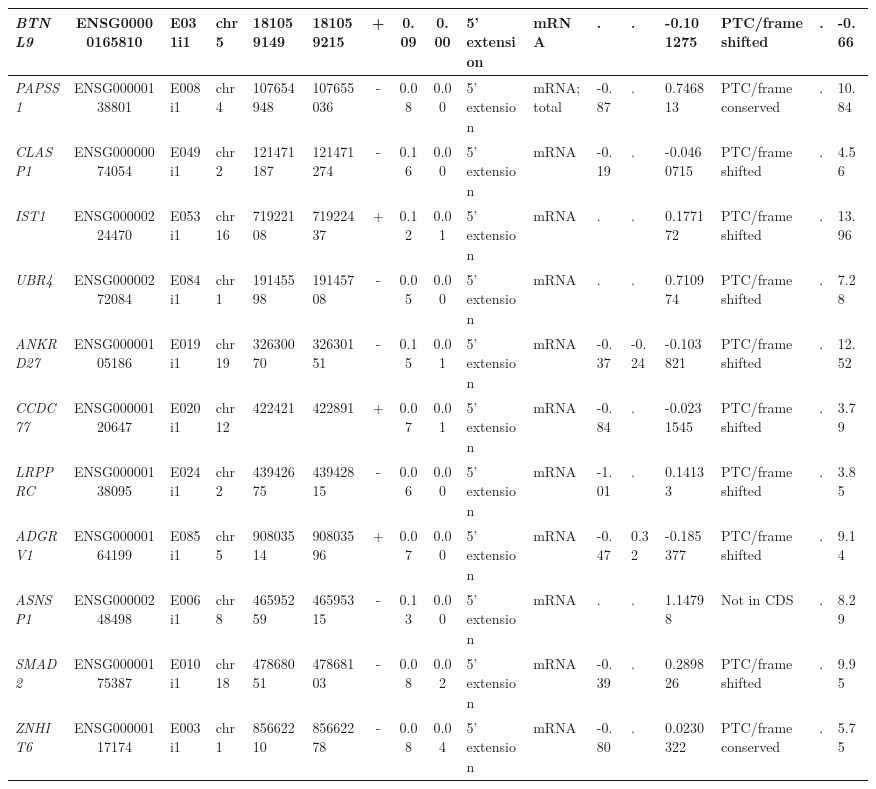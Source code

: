 \begin{appendices}
\begin{landscape}
\begin{table}
{\begin{tabular}{|l|c|l|l|l|l|c|c|c|l|l|l|l|l|l|l|l|}
		\textit{BTNL9} & ENSG00000165810 & E031i1 & chr5  & 181059149 & 181059215 & +     & 0.09  & 0.00  & 5' extension & mRNA  & . & . & -0.101275 & PTC/frame shifted & . &  -0.66 \\ \hline
		\textit{PAPSS1} & ENSG00000138801 & E008i1 & chr4  & 107654948 & 107655036 & -     & 0.08  & 0.00  & 5' extension & mRNA;total & -0.87 & . & 0.746813 & PTC/frame conserved & . &  10.84 \\ \hline
		\textit{CLASP1} & ENSG00000074054 & E049i1 & chr2  & 121471187 & 121471274 & -     & 0.16  & 0.00  & 5' extension & mRNA  & -0.19 & . & -0.0460715 & PTC/frame shifted & . &  4.56 \\ \hline
		\textit{IST1} & ENSG00000224470 & E053i1 & chr16 & 71922108 & 71922437 & +     & 0.12  & 0.01  & 5' extension & mRNA  & . & . & 0.177172 & PTC/frame shifted & . &  13.96 \\ \hline
		\textit{UBR4} & ENSG00000272084& E084i1 & chr1  & 19145598 & 19145708 & -     & 0.05  & 0.00  & 5' extension & mRNA  & . & . & 0.710974 & PTC/frame shifted & . &  7.28 \\ \hline
		\textit{ANKRD27} & ENSG00000105186 & E019i1 & chr19 & 32630070 & 32630151 & -     & 0.15  & 0.01  & 5' extension & mRNA  & -0.37 & -0.24 & -0.103821 & PTC/frame shifted & . &  12.52 \\ \hline
		\textit{CCDC77} & ENSG00000120647 & E020i1 & chr12 & 422421 & 422891 & +     & 0.07  & 0.01  & 5' extension & mRNA  & -0.84 & . & -0.0231545 & PTC/frame shifted & . &  3.79 \\ \hline
		\textit{LRPPRC} & ENSG00000138095 & E024i1 & chr2  & 43942675 & 43942815 & -     & 0.06  & 0.00  & 5' extension & mRNA  & -1.01 & . & 0.14133 & PTC/frame shifted & . &  3.85 \\ \hline
		\textit{ADGRV1} & ENSG00000164199 & E085i1 & chr5  & 90803514 & 90803596 & +     & 0.07  & 0.00  & 5' extension & mRNA  & -0.47 & 0.32  & -0.185377 & PTC/frame shifted & . &  9.14 \\ \hline
		\textit{ASNSP1} & ENSG00000248498 & E006i1 & chr8  & 46595259 & 46595315 & -     & 0.13  & 0.00  & 5' extension & mRNA  & . & . & 1.14798 & Not in CDS     & . &  8.29 \\ \hline
		\textit{SMAD2} & ENSG00000175387 & E010i1 & chr18 & 47868051 & 47868103 & -     & 0.08  & 0.02  & 5' extension & mRNA  & -0.39 & . & 0.289826 & PTC/frame shifted & . &  9.95 \\ \hline
		\textit{ZNHIT6} & ENSG00000117174 & E003i1 & chr1  & 85662210 & 85662278 & -     & 0.08  & 0.04  & 5' extension & mRNA  & -0.80 & . & 0.0230322 & PTC/frame conserved & . &  5.75 \\ \hline

\end{tabular}}
\end{table}
\end{landscape}
\end{appendices}
